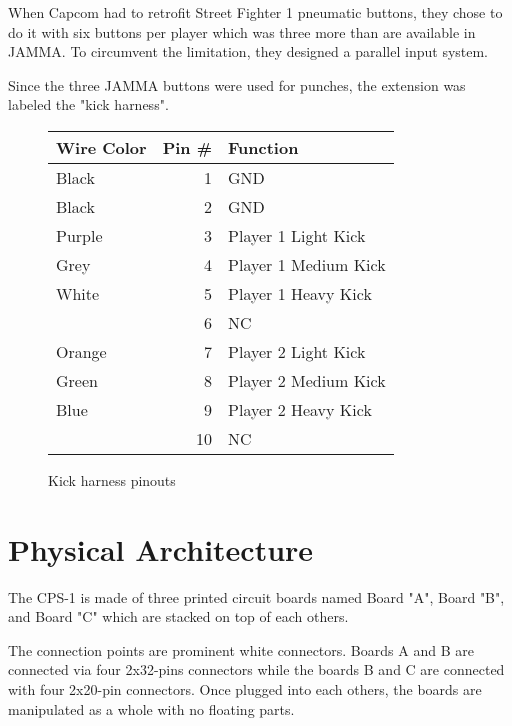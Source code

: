 When Capcom had to retrofit Street Fighter 1 pneumatic buttons, they chose to do it with six buttons per player which was three more than are available in JAMMA. To circumvent the limitation, they designed a parallel input system. 

Since the three JAMMA buttons were used for punches, the extension was labeled the "kick harness".

\begin{figure}[H]

\begin{tabularx}{\textwidth}{lrX}
  \toprule    
  \textbf{Wire Color } & \textbf{ Pin \#}  & \textbf{Function } \\               
  \toprule   
  Black & 1 & GND \\
  Black & 2 & GND \\
  \toprule   
  Purple & 3 & Player 1 Light Kick \\
  Grey & 4 & Player 1 Medium Kick \\
  White & 5 & Player 1 Heavy Kick \\
  \toprule   
  & 6 & NC \\
  \toprule   
  Orange & 7 & Player 2 Light Kick\\
  Green & 8 & Player 2 Medium Kick\\
  Blue & 9 & Player 2 Heavy Kick\\
  \toprule   
  & 10 & NC \\
  \toprule   
\end{tabularx}
\caption*{Kick harness pinouts}
\end{figure}










  


\section{Physical Architecture}
 The CPS-1 is made of three printed circuit boards named Board "A", Board "B", and Board "C" which are stacked on top of each others.


\begin{figure}[H]
\centering
{}
\end{figure}

\pagebreak
The connection points are prominent white connectors. Boards A and B are connected via four 2x32-pins connectors while the boards B and C are connected with four 2x20-pin connectors.  Once plugged into each others, the boards are manipulated as a whole with no floating parts.


